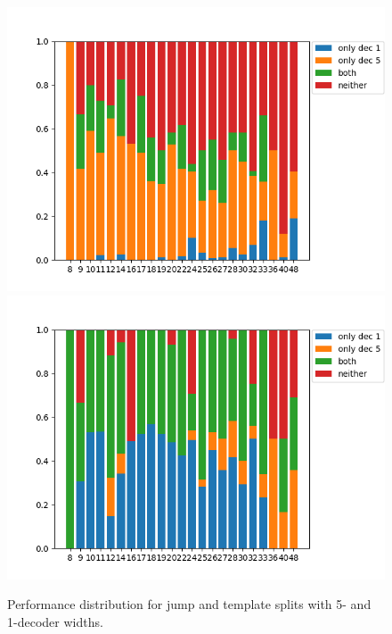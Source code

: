 
\begin{figure}[h]
    \centering
    \includegraphics[width=.4\textwidth,keepaspectratio]{figures/jump_subset_out.png}
    \includegraphics[width=.4\textwidth,keepaspectratio]{figures/template_subset_out.png}
    \caption{Performance distribution for jump and template splits with 5- and 1-decoder widths.}
    \label{fig:kernel_width}
\end{figure}


